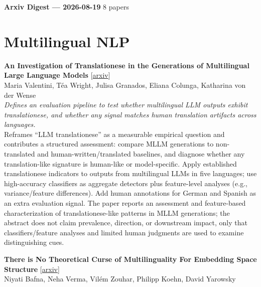\documentclass[12pt,letterpaper]{article}
\begin{document}
{\footnotesize\textbf{Arxiv Digest --- 2026-08-19} \hfill 8 papers}

\smallskip

\section*{Multilingual NLP}

{\small\textbf{An Investigation of Translationese in the Generations of Multilingual Large Language Models}} {\scriptsize[\href{https://arxiv.org/abs/2608.17399}{arxiv}]}\\
{\scriptsize Maria Valentini, T\'ea Wright, Julisa Granados, Eliana Colunga, Katharina von der Wense}\\

{\small\textit{Defines an evaluation pipeline to test whether multilingual LLM outputs exhibit translationese, and whether any signal matches human translation artifacts across languages.}}\\[1pt]
{\footnotesize Reframes ``LLM translationese'' as a measurable empirical question and contributes a structured assessment: compare MLLM generations to non-translated and human-written/translated baselines, and diagnose whether any translation-like signature is human-like or model-specific. Apply established translationese indicators to outputs from multilingual LLMs in five languages; use high-accuracy classifiers as aggregate detectors plus feature-level analyses (e.g., variance/feature differences). Add human annotations for German and Spanish as an extra evaluation signal. The paper reports an assessment and feature-based characterization of translationese-like patterns in MLLM generations; the abstract does not claim prevalence, direction, or downstream impact, only that classifiers/feature analyses and limited human judgments are used to examine distinguishing cues.}

\medskip

{\small\textbf{There is No Theoretical Curse of Multilinguality For Embedding Space Structure}} {\scriptsize[\href{https://arxiv.org/abs/2608.17088}{arxiv}]}\\
{\scriptsize Niyati Bafna, Neha Verma, Vil\'em Zouhar, Philipp Koehn, David Yarowsky}\\
\end{document}
